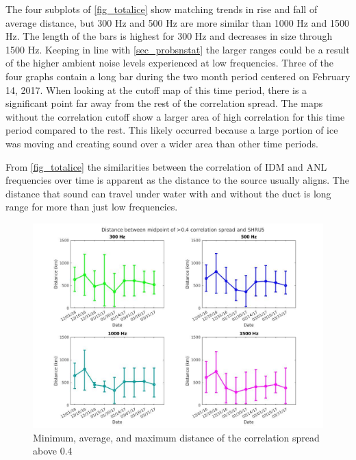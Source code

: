 The four subplots of \autoref{fig_totalice} show matching trends in rise and fall of average distance, but 300 Hz and 500 Hz are more similar than 1000 Hz and 1500 Hz. The length of the bars is highest for 300 Hz and decreases in size through 1500 Hz. Keeping in line with \autoref{sec_probsnstat} the larger ranges could be a result of the higher ambient noise levels experienced at low frequencies. Three of the four graphs contain a long bar during the two month period centered on February 14, 2017. When looking at the cutoff map of this time period, there is a significant point far away from the rest of the correlation spread. The maps without the correlation cutoff show a larger area of high correlation for this time period compared to the rest. This likely occurred because a large portion of ice was moving and creating sound over a wider area than other time periods.

From \autoref{fig_totalice} the similarities between the correlation of IDM and ANL frequencies over time is apparent as the distance to the source usually aligns. The distance that sound can travel under water with and without the duct is long range for more than just low frequencies. 
\begin{figure}[p]
\centering
\includegraphics[scale=0.38]{Figures/errorbars_tiled_noisland.jpg}
\caption{Minimum, average, and maximum distance of the correlation spread above 0.4}
\label{fig_totalice}
\end{figure}


